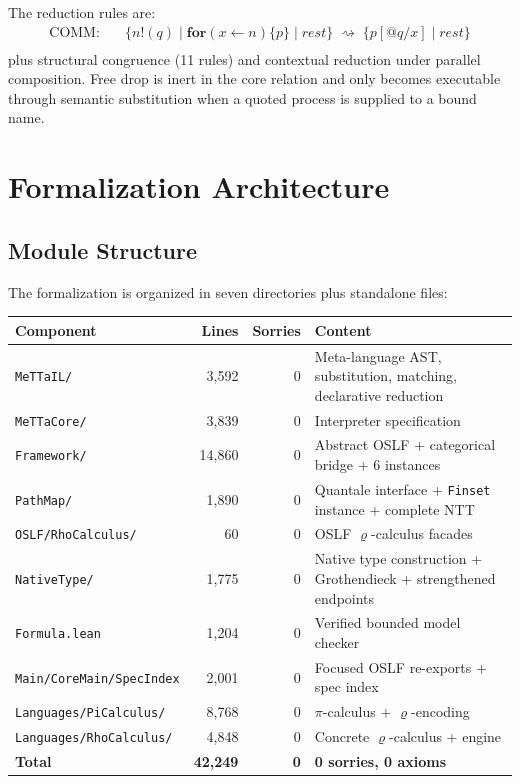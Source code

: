 \documentclass[]{article}
\newcommand{\code}[1]{\texttt{#1}}
\newcommand{\rhocalc}{\ensuremath{\varrho}}
\newcommand{\OSLF}{\textup{OSLF}}
\begin{document}
The reduction rules are:
\begin{align}
  \text{COMM:}\quad & \{n!(q) \mid \mathbf{for}(x \leftarrow n)\{p\} \mid \mathit{rest}\}
    \;\rightsquigarrow\; \{p[@q/x] \mid \mathit{rest}\} \\
\end{align}
plus structural congruence (11 rules) and contextual reduction under parallel composition.
Free drop is inert in the core relation and only becomes executable through
semantic substitution when a quoted process is supplied to a bound name.

\section{Formalization Architecture}

\subsection{Module Structure}

The formalization is organized in seven directories plus standalone files:

\begin{center}
\begin{tabular}{lrrl}
\textbf{Component} & \textbf{Lines} & \textbf{Sorries} & \textbf{Content} \\
\hline
\code{MeTTaIL/}        & 3{,}592 & 0  & Meta-language AST, substitution, matching, declarative reduction \\
\code{MeTTaCore/}      & 3{,}839 & 0  & Interpreter specification \\
\code{Framework/}      & 14{,}860 & 0  & Abstract \OSLF{} + categorical bridge + 6 instances \\
\code{PathMap/}        & 1{,}890 & 0  & Quantale interface + \code{Finset} instance + complete NTT \\
\code{OSLF/RhoCalculus/} &    60 & 0  & \OSLF{} \rhocalc{}-calculus facades \\
\code{NativeType/}     & 1{,}775 & 0  & Native type construction + Grothendieck + strengthened endpoints \\
\code{Formula.lean}    & 1{,}204 & 0  & Verified bounded model checker \\
\code{Main/CoreMain/SpecIndex} & 2{,}001 & 0 & Focused \OSLF{} re-exports + spec index \\
\hline
\code{Languages/PiCalculus/}  & 8{,}768 & 0  & $\pi$-calculus + \rhocalc{}-encoding \\
\code{Languages/RhoCalculus/} & 4{,}848 & 0  & Concrete \rhocalc{}-calculus + engine \\
\hline
\textbf{Total}         & \textbf{42{,}249} & \textbf{0} & \textbf{0 sorries, 0 axioms}
\end{tabular}
\end{center}
\end{document}
